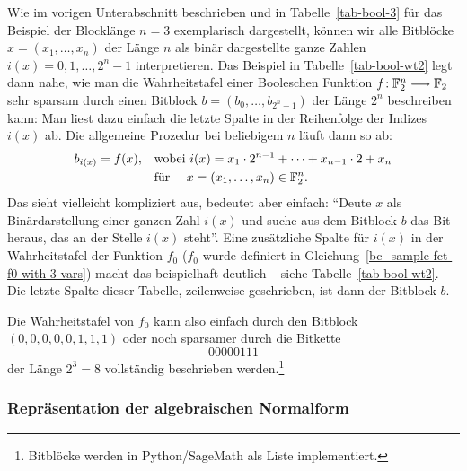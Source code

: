 \begin{refsegment}
Wie im vorigen Unterabschnitt beschrieben und in Tabelle~\ref{tab-bool-3}
für das Beispiel der Blocklänge $n = 3$ exemplarisch dargestellt, können
wir alle Bitblöcke $x = (x_1, \ldots, x_n)$ der Länge $n$
als binär dargestellte ganze Zahlen $i(x) = 0, 1, \ldots, 2^n-1$ interpretieren.
Das Beispiel in Tabelle~\ref{tab-bool-wt2} legt dann nahe, wie man
die Wahrheitstafel einer Booleschen
Funktion $f\!: \mathbb{F}_2^n \longrightarrow \mathbb{F}_2$ sehr sparsam durch einen Bitblock
$b = (b_0, \ldots, b_{2^n-1})$ der Länge $2^n$ beschreiben kann:
Man liest dazu einfach die letzte Spalte in der Reihenfolge
der Indizes $i(x)$ ab. Die allgemeine Prozedur bei beliebigem $n$ läuft dann
so ab:
\begin{align*}
     b_{i(x)} = f(x), \quad & \text{wobei }
     i(x) = x_1 \cdot 2^{n-1} + \cdots + x_{n-1} \cdot 2 + x_n \\
     & \text{für }\quad x = (x_1, \ldots, x_n) \in \mathbb{F}_2^n.
\end{align*}
Das sieht vielleicht kompliziert aus, bedeutet aber einfach: "`Deute $x$ als
Binärdarstellung einer ganzen Zahl $i(x)$ und suche aus dem Bitblock $b$ das
Bit heraus, das an der Stelle $i(x)$ steht"'. Eine zusätzliche Spalte für
$i(x)$ in der Wahrheitstafel der Funktion $f_0$ ($f_0$ wurde definiert in
Gleichung~\ref{bc_sample-fct-f0-with-3-vars}) %
macht das beispielhaft deutlich -- siehe Tabelle~\ref{tab-bool-wt2}. Die
letzte Spalte dieser Tabelle, zeilenweise geschrieben, ist dann der
Bitblock $b$.

Die Wahrheitstafel von $f_0$ kann also einfach durch den Bitblock
$(0,0,0,0,0,1,1,1)$ oder noch sparsamer durch die Bitkette
\[
     00000111
\]
der Länge $2^3 = 8$ vollständig beschrieben werden.\footnote{%
  Bitblöcke werden in Python/SageMath als Liste implementiert.
}


\subsubsection*{Repräsentation der algebraischen Normalform}


\end{refsegment}

